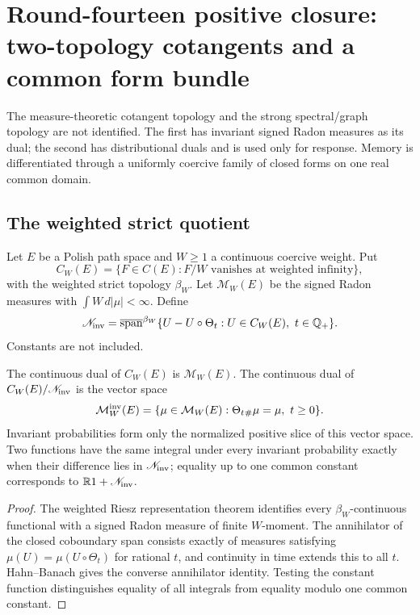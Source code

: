 
\section{Round-fourteen positive closure: two-topology cotangents and a common form bundle}
\label{sec:r14-c2}

The measure-theoretic cotangent topology and the strong spectral/graph
topology are not identified.  The first has invariant signed Radon measures
as its dual; the second has distributional duals and is used only for
response.  Memory is differentiated through a uniformly coercive family of
closed forms on one real common domain.

\subsection{The weighted strict quotient}

Let \(E\) be a Polish path space and \(W\ge1\) a continuous coercive weight.
Put
\[
 C_W(E)=\{F\in C(E):F/W\text{ vanishes at weighted infinity}\},
\]
with the weighted strict topology \(\beta_W\).  Let
\(\mathcal M_W(E)\) be the signed Radon measures with
\(\int W\,d|\mu|<\infty\).  Define
\[
 \mathscr N_{\rm inv}
 =
 \overline{\operatorname{span}}^{\beta_W}
 \{U-U\circ\Theta_t:U\in C_W(E),\ t\in\mathbb Q_+\}.
\]
Constants are not included.

\begin{theorem}
\label{thm:r14-c2-radon}
The continuous dual of \(C_W(E)\) is \(\mathcal M_W(E)\).
The continuous dual of
\(C_W(E)/\mathscr N_{\rm inv}\) is the vector space
\[
 \mathcal M_W^{\rm inv}(E)
 =\{\mu\in\mathcal M_W(E):\Theta_t{}_\#\mu=\mu,\ t\ge0\}.
\]
Invariant probabilities form only the normalized positive slice of this
vector space.  Two functions have the same integral under every invariant
probability exactly when their difference lies in
\(\mathscr N_{\rm inv}\); equality up to one common constant corresponds to
\(\mathbb R1+\mathscr N_{\rm inv}\).
\end{theorem}

\begin{proof}
The weighted Riesz representation theorem identifies every
\(\beta_W\)-continuous functional with a signed Radon measure of finite
\(W\)-moment.  The annihilator of the closed coboundary span consists exactly
of measures satisfying
\(\mu(U)=\mu(U\circ\Theta_t)\) for rational \(t\), and continuity in time
extends this to all \(t\).  Hahn--Banach gives the converse annihilator
identity.  Testing the constant function distinguishes equality of all
integrals from equality modulo one common constant.
\end{proof}

